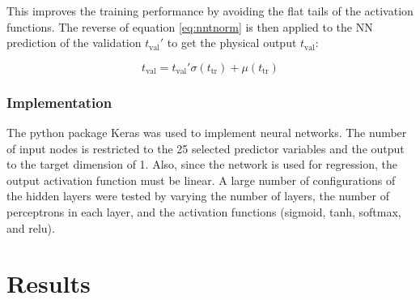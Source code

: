 \documentclass{scrartcl}
\begin{document}
\noindent This improves the training performance by avoiding the flat tails of the activation functions. The reverse of equation \ref{eq:nntnorm} is then applied to the \gls{NN} prediction of the validation $t_\text{val}'$ to get the physical output $t_\text{val}$:

\begin{equation}
  t_\text{val} = t_\text{val}'\sigma(t_\text{tr}) + \mu(t_\text{tr})
\end{equation}

\subsubsection{Implementation}
The python package Keras \cite{keras} was used to implement neural networks. The number of input nodes is restricted to the 25 selected predictor variables and the output to the target dimension of 1. Also, since the network is used for regression, the output activation function must be linear. A large number of configurations of the hidden layers were tested by varying the number of layers, the number of perceptrons in each layer, and the activation functions (sigmoid, tanh, softmax, and relu). 


\section{Results}


\end{document}
